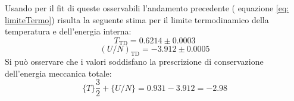 Usando per il fit di queste osservabili l'andamento precedente ( equazione \ref{eq: limiteTermo}) risulta la seguente stima per il limite termodinamico della temperatura e dell'energia interna:
\begin{displaymath}
T_{\textrm{TD}} = 0.6214 \pm 0.0003
\end{displaymath}
\begin{displaymath}
(U/N)_{\textrm{TD}} = -3.912 \pm 0.0005
\end{displaymath}
Si può osservare che i valori soddisfano la prescrizione di conservazione dell'energia meccanica totale:
\begin{displaymath}
\lbrace T \rbrace \dfrac{3}{2} + \lbrace U/N \rbrace =  0.931 - 3.912 = -2.98
\end{displaymath}